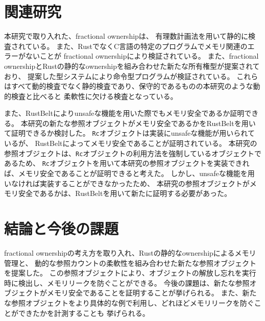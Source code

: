 \documentclass{sumiilab-paper}
\theoremstyle{mystyle}
\numberwithin{definition}{chapter} %
\begin{document}
\chapter{関連研究}
本研究で取り入れた、fractional ownership\cite{DBLP:conf/sas/Boyland03}は、
有理数計画法を用いて静的に検査されている。
また、RustでなくC言語の特定のプログラムでメモリ関連のエラーがないことが
fractional ownershipにより検証されている\cite{10.1007/978-3-642-10672-9_11}。
また、fractional ownershipとRustの静的なownershipを組み合わせた新たな所有権型が提案されており、
提案した型システムにより命令型プログラムが検証されている\cite{10.1007/978-3-031-50521-8_11}。
これらはすべて動的検査でなく静的検査であり、保守的であるものの本研究のような動的検査と比べると
柔軟性に欠ける検査となっている。

また、RustBelt\cite{DBLP:journals/pacmpl/0002JKD18}によりunsafeな機能を用いた際でもメモリ安全であるか証明できる。
本研究の新たな参照オブジェクトがメモリ安全であるかをRustBeltを用いて証明できるか検討した。
\texttt{Rc}オブジェクトは実装にunsafeな機能が用いられているが、
RustBeltによってメモリ安全であることが証明されている。
本研究の参照オブジェクトは、\texttt{Rc}オブジェクトの利用方法を強制しているオブジェクトであるため、
\texttt{Rc}オブジェクトを用いて本研究の参照オブジェクトを実装できれば、メモリ安全であることが証明できると考えた。
しかし、unsafeな機能を用いなければ実装することができなかったため、
本研究の参照オブジェクトがメモリ安全であるかは、RustBeltを用いて新たに証明する必要があった。

\chapter{結論と今後の課題}
fractional ownershipの考え方を取り入れ、Rustの静的なownershipによるメモリ管理と、
動的な参照カウントの柔軟性を組み合わせた新たな参照オブジェクトを提案した。
この参照オブジェクトにより、オブジェクトの解放し忘れを実行時に検出し、メモリリークを防ぐことができる。
今後の課題は、新たな参照オブジェクトがメモリ安全であることを証明することが挙げられる。
また、新たな参照オブジェクトをより具体的な例で利用し、どれほどメモリリークを防ぐことができたかを計測することも
挙げられる。

\backmatter%



\end{document}
